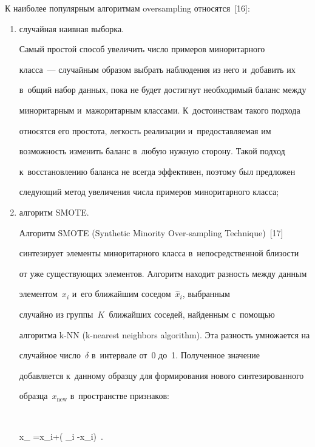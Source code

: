   


  К наиболее популярным алгоритмам oversampling относятся~[16]:


  \begin{enumerate}[(1)]


  \item случайная наивная выборка.


  


  Самый простой способ увеличить чис\-ло примеров миноритарного 


класса~--- случайным образом выбрать наблюдения из него и~добавить их 


в~общий набор данных, пока не будет достигнут необходимый баланс между 


миноритарным и~мажоритарным классами. К~достоинствам такого подхода 


относятся его простота, легкость реализации и~предоставляемая им 


возможность изменить баланс в~любую нуж\-ную сторону. Такой подход 


к~восстановлению баланса не всегда эффективен, поэтому был предложен 


следующий метод увеличения числа примеров миноритарного класса;


  \item алгоритм SMOTE. 


  


  Алгоритм SMOTE (Synthetic Minority Over-sampling Technique)~[17] 


синтезирует элементы миноритарного класса в~непосредственной бли\-зости 


от уже существующих элементов. Алгоритм находит разность между данным 


элементом~$x_i$ и~его ближайшим соседом~$\hat{x}_i$, выбранным 


случайно из группы~$K$~ближайших соседей, найденным с~по\-мощью 


алгоритма k-NN (k-nearest neighbors algorithm). Эта разность умножается на 


случайное число~$\delta$ в~интервале от~0 до~1. Полученное значение 


добавляется к~данному образцу для формирования нового синтезированного 


образца~$x_{\mathrm{new}}$ в~пространстве признаков:


  $$


  x_{} =x_i+\left( _i -x_i\right) \delta\,.



\end{enumerate}
